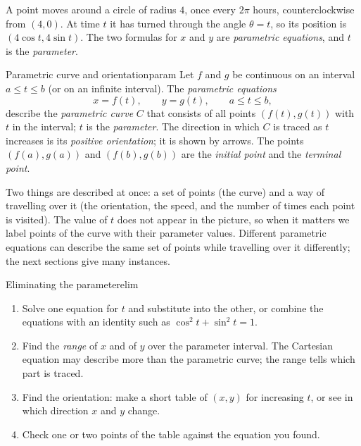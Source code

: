 \documentclass[11pt]{article}
\begin{document}
A point moves around a circle of radius $4$, once every $2\pi$ hours, counterclockwise from $(4,0)$. At time $t$ it has turned through the angle $\theta=t$, so its position is $(4\cos t,4\sin t)$. The two formulas for $x$ and $y$ are \emph{parametric equations}, and $t$ is the \emph{parameter}.

\begin{defn}{Parametric curve and orientation}{param}
Let $f$ and $g$ be continuous on an interval $a\le t\le b$ (or on an infinite interval). The \emph{parametric equations}
\[
x=f(t),\qquad y=g(t),\qquad a\le t\le b,
\]
describe the \emph{parametric curve} $C$ that consists of all points $(f(t),g(t))$ with $t$ in the interval; $t$ is the \emph{parameter}. The direction in which $C$ is traced as $t$ increases is its \emph{positive orientation}; it is shown by arrows. The points $(f(a),g(a))$ and $(f(b),g(b))$ are the \emph{initial point} and the \emph{terminal point}.
\end{defn}

Two things are described at once: a set of points (the curve) and a way of travelling over it (the orientation, the speed, and the number of times each point is visited). The value of $t$ does not appear in the picture, so when it matters we label points of the curve with their parameter values. Different parametric equations can describe the same set of points while travelling over it differently; the next sections give many instances.

\begin{proc}{Eliminating the parameter}{elim}
\begin{enumerate}[nosep]
  \item Solve one equation for $t$ and substitute into the other, or combine the equations with an identity such as $\cos^2t+\sin^2t=1$.
  \item Find the \emph{range} of $x$ and of $y$ over the parameter interval. The Cartesian equation may describe more than the parametric curve; the range tells which part is traced.
  \item Find the orientation: make a short table of $(x,y)$ for increasing $t$, or see in which direction $x$ and $y$ change.
  \item Check one or two points of the table against the equation you found.
\end{enumerate}
\end{proc}
\end{document}
